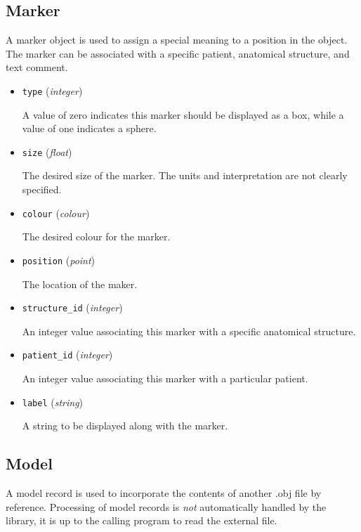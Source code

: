 \documentclass{article}
\newcommand{\kw}[1]{{\tt \mbox{#1}}}
\begin{document}
\subsection{Marker}

A marker object is used to assign a special meaning to a position in the
object.  The marker can be associated with a specific patient,
anatomical structure, and text comment.

\begin{itemize}

\item \kw{type} ({\it integer}) 

A value of zero indicates this marker should be displayed as a box,
while a value of one indicates a sphere.

\item \kw{size} ({\it float})

The desired size of the marker.  The units and interpretation are not
clearly specified.

\item \kw{colour} ({\it colour})

The desired colour for the marker.

\item \kw{position} ({\it point})

The location of the maker.

\item \kw{structure\_id} ({\it integer})

An integer value associating this marker with a specific anatomical
structure.

\item \kw{patient\_id} ({\it integer})

An integer value associating this marker with a particular patient.

\item \kw{label} ({\it string})

A string to be displayed along with the marker.

\end{itemize}

\subsection{Model}

A model record is used to incorporate the contents of another .obj file
by reference.  Processing of model records is {\it not} automatically
handled by the library, it is up to the calling program to read the
external file.
\end{document}
